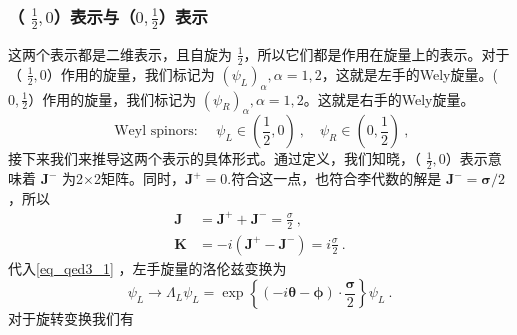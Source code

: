 \subsubsection{（ $\frac{1}{2},0$）表示与（$0,\frac{1}{2}$）表示}
这两个表示都是二维表示，且自旋为 $\frac{1}{2}$，所以它们都是作用在旋量上的表示。对于（ $\frac{1}{2},0$）作用的旋量，我们标记为 $\left(\psi_{L}\right)_{\alpha},\alpha=1,2$，这就是左手的Wely旋量。($0,\frac{1}{2}$）作用的旋量，我们标记为 $\left(\psi_{R}\right)_{\alpha},\alpha=1,2$。这就是右手的Wely旋量。
\begin{equation}
\text { Weyl spinors: } \quad \psi_{L} \in\left(\frac{1}{2}, 0\right)~, \quad \psi_{R} \in\left(0, \frac{1}{2}\right)~,
\end{equation}
接下来我们来推导这两个表示的具体形式。通过定义，我们知晓，（ $\frac{1}{2},0$）表示意味着 $\mathbf{J}^{-}$ 为2×2矩阵。同时，$\mathbf{J}^{+}=0$.符合这一点，也符合李代数的解是 $\mathbf{J}^{-}=\boldsymbol{\sigma} / 2$，所以
\begin{equation}
\begin{aligned}
\mathbf{J} &=\mathbf{J}^{+}+\mathbf{J}^{-}=\frac{\sigma}{2} ~,\\
\mathbf{K} &=-i\left(\mathbf{J}^{+}-\mathbf{J}^{-}\right)=i \frac{\sigma}{2}~.
\end{aligned}
\end{equation}
代入\autoref{eq_qed3_1} ，左手旋量的洛伦兹变换为
\begin{equation}
\psi_{L} \rightarrow \Lambda_{L} \psi_{L}=\exp \left\{(-i \boldsymbol{\theta}-\boldsymbol{\phi}) \cdot \frac{\boldsymbol{\sigma}}{2}\right\} \psi_{L}~.
\end{equation}
对于旋转变换我们有
